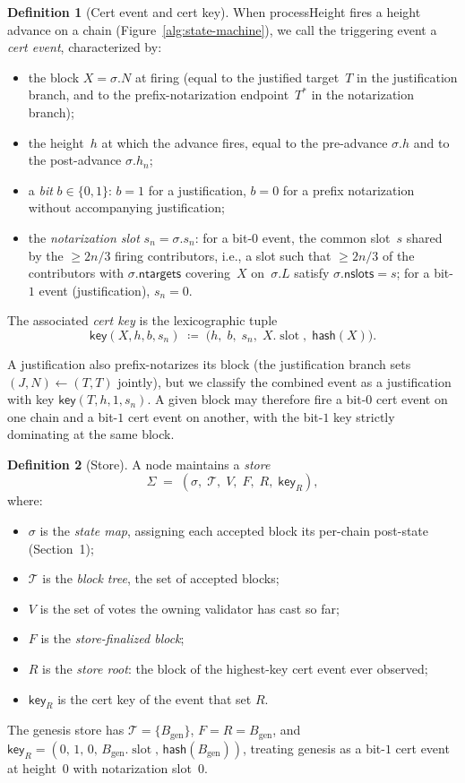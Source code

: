 \ifx\litemode\undefined\documentclass{article}\fi
\newcommand{\genesis}{\ensuremath{B_{\mathrm{gen}}}}
\newcommand{\T}[0]{\ensuremath{\mathcal{T}}}
\newcommand{\slot}[0]{\ensuremath{\operatorname{\mathrm{slot}}}}
\newcommand{\ntargets}{\mathsf{ntargets}}
\newcommand{\nslots}{\mathsf{nslots}}
\newcommand{\hash}{\mathsf{hash}}
\newcommand{\key}{\mathsf{key}}
\newcommand{\processHeight}{\textsf{processHeight}\xspace}
\theoremstyle{plain}
\theoremstyle{definition}
\newtheorem{definition}{Definition}
\theoremstyle{remark}
\begin{document}
\begin{definition}[Cert event and cert key]\label{def:cert-event}
When \processHeight fires a height advance on a chain (Figure~\ref{alg:state-machine}), we call the triggering event a \emph{cert event}, characterized by:
\begin{itemize}
  \item the block $X = \sigma.N$ at firing (equal to the justified target~$T$ in the justification branch, and to the prefix-notarization endpoint~$T^*$ in the notarization branch);
  \item the height~$h$ at which the advance fires, equal to the pre-advance $\sigma.h$ and to the post-advance $\sigma.h_n$;
  \item a \emph{bit} $b \in \{0, 1\}$: $b = 1$ for a justification, $b = 0$ for a prefix notarization without accompanying justification;
  \item the \emph{notarization slot} $s_n = \sigma.s_n$: for a bit-$0$ event, the common slot~$s$ shared by the $\geq 2n/3$ firing contributors, i.e., a slot such that $\geq 2n/3$ of the contributors with $\sigma.\ntargets$ covering~$X$ on~$\sigma.L$ satisfy $\sigma.\nslots = s$; for a bit-$1$ event (justification), $s_n = 0$.
\end{itemize}
The associated \emph{cert key} is the lexicographic tuple
\[
  \key(X, h, b, s_n) \;\coloneqq\; \bigl(h,\; b,\; s_n,\; X.\slot,\; \hash(X)\bigr).
\]
\end{definition}

A justification also prefix-notarizes its block (the justification branch sets $(J, N) \gets (T, T)$ jointly), but we classify the combined event as a justification with key $\key(T, h, 1, s_n)$.
A given block may therefore fire a bit-$0$ cert event on one chain and a bit-$1$ cert event on another, with the bit-$1$ key strictly dominating at the same block.

\begin{definition}[Store]\label{def:store}
A node maintains a \emph{store}
\[
  \Sigma \;=\; (\sigma,\; \T,\; V,\; F,\; R,\; \key_R),
\]
where:
\begin{itemize}
  \item $\sigma$ is the \emph{state map}, assigning each accepted block its per-chain post-state (Section~1);
  \item $\T$ is the \emph{block tree}, the set of accepted blocks;
  \item $V$ is the set of votes the owning validator has cast so far;
  \item $F$ is the \emph{store-finalized block};
  \item $R$ is the \emph{store root}: the block of the highest-key cert event ever observed;
  \item $\key_R$ is the cert key of the event that set $R$.
\end{itemize}
The genesis store has $\T = \{\genesis\}$, $F = R = \genesis$, and $\key_R = (0,\, 1,\, 0,\, \genesis.\slot,\, \hash(\genesis))$, treating genesis as a bit-$1$ cert event at height~$0$ with notarization slot~$0$.
\end{definition}
\end{document}
